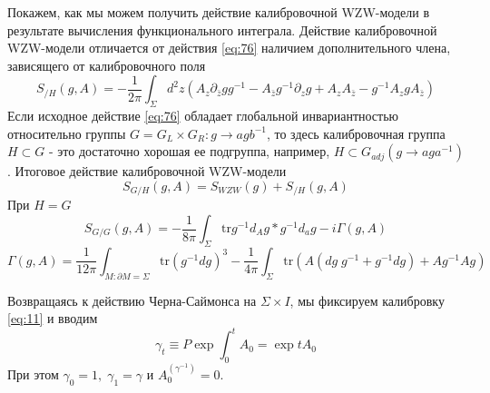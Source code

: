 \documentclass[a4paper,12pt]{article}
\theoremstyle{definition} \newtheorem{Def}{Definition}
\begin{document}
Покажем, как мы можем получить действие калибровочной WZW-модели в результате вычисления функционального интеграла.
Действие калибровочной WZW-модели отличается от действия \eqref{eq:76} наличием дополнительного члена, зависящего от калибровочного поля
\begin{equation}
  \label{eq:15}
  S_{/H}(g,A)=-\frac{1}{2\pi}\int_{\Sigma}d^2z (A_z\partial_{\bar z} g g^{-1}-A_{\bar z} g^{-1}\partial_z g+ A_z A_{\bar z} - g^{-1}A_z g A_{\bar z})
\end{equation}
Если исходное действие \eqref{eq:76} обладает глобальной инвариантностью относительно группы $G=G_L\times G_R: g\to a g b^{-1}$, то здесь калибровочная группа $H\subset G$ - это достаточно хорошая ее подгруппа, например, $H\subset G_{adj}(g\to a g a^{-1})$. Итоговое действие калибровочной WZW-модели
\begin{equation}
  \label{eq:16}
  S_{G/H}(g,A)=S_{WZW}(g)+S_{/H}(g,A)
\end{equation}
При $H=G$
\begin{equation}
  \label{eq:17}
  S_{G/G}(g,A)=-\frac{1}{8\pi}\int_{\Sigma} \mathrm{tr} g^{-1} d_A g * g^{-1} d_a g-i\Gamma(g,A)
\end{equation}
\begin{equation}
  \label{eq:18}
  \Gamma(g,A)=\frac{1}{12\pi}\int_{M:\partial M=\Sigma}\mathrm{tr}(g^{-1}dg)^3-\frac{1}{4\pi}\int_{\Sigma}\mathrm{tr}\left(A(dg\; g^{-1}+g^{-1} dg)+Ag^{-1} A g\right)
\end{equation}

Возвращаясь к действию Черна-Саймонса на $\Sigma\times I$, мы фиксируем калибровку \eqref{eq:11} и вводим
\begin{equation}
  \label{eq:19}
  \gamma_t\equiv P\exp\int_0^t A_0=\exp tA_0
\end{equation}
При этом $\gamma_0=1,\; \gamma_1=\gamma$ и $A^{(\gamma^{-1})}_0=0$.
\end{document}
